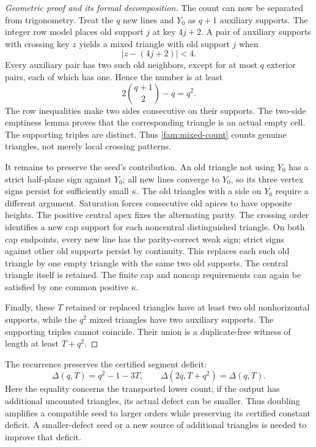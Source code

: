 \begin{proof}[Geometric proof and its formal decomposition]
The count can now be separated from trigonometry.  Treat the $q$ new lines
and $Y_0$ as $q+1$ auxiliary supports.  The integer row model places old
support $j$ at key $4j+2$.  A pair of auxiliary supports with crossing key
$z$ yields a mixed triangle with old support $j$ when
\begin{equation}
  |z-(4j+2)|<4.
  \label{fam:neighbors}
\end{equation}
Every auxiliary pair has two such old neighbors, except for at most $q$
exterior pairs, each of which has one.  Hence the number is at least
\begin{equation}
 2\binom{q+1}{2}-q=q^2.
 \label{fam:mixed-count}
\end{equation}
The row inequalities make two sides consecutive on their supports.
The two-side emptiness lemma proves that the corresponding triangle is
an actual empty cell.  The supporting triples are distinct.  Thus
\eqref{fam:mixed-count} counts genuine triangles, not merely local
crossing patterns.

It remains to preserve the seed's contribution.  An old triangle not
using $Y_0$ has a strict half-plane sign against $Y_0$; all new lines
converge to $Y_0$, so its three vertex signs persist for sufficiently
small $\kappa$.  The old triangles with a side on $Y_0$ require a different
argument.  Saturation forces consecutive old apices to have opposite
heights.  The positive central apex fixes the alternating parity.
The crossing order identifies a new cap support for each noncentral
distinguished triangle.  On both cap endpoints, every new line has the
parity-correct weak sign; strict signs against other old supports
persist by continuity.  This replaces each such old triangle by one
empty triangle with the same two old supports.  The central triangle
itself is retained.  The finite cap and noncap requirements can again
be satisfied by one common positive $\kappa$.

Finally, these $T$ retained or replaced triangles have at least two old
nonhorizontal supports, while the $q^2$ mixed triangles have two
auxiliary supports.  The supporting triples cannot coincide.  Their
union is a duplicate-free witness of length at least $T+q^2$.
\end{proof}

The recurrence preserves the certified segment deficit:
\begin{equation}
 \Delta(q,T)=q^2-1-3T,\qquad
 \Delta(2q,T+q^2)=\Delta(q,T).
 \label{fam:deficit-preserved}
\end{equation}
Here the equality concerns the transported lower count; if the output
has additional uncounted triangles, its actual defect can be smaller.
Thus doubling amplifies a compatible seed to larger orders while
preserving its certified constant deficit.  A smaller-defect seed or a
new source of additional triangles is needed to improve that deficit.

